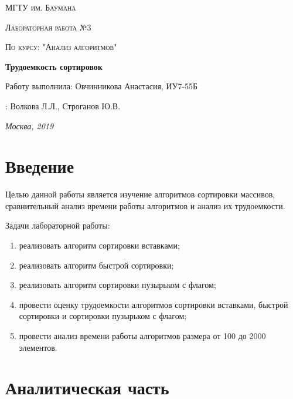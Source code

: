 \documentclass[a4paper,14pt]{report}
\begin{document}
\begin{titlepage}
	\centering
	{\scshape\LARGE МГТУ им. Баумана \par}
	\vspace{3cm}
	{\scshape\Large Лабораторная работа №3\par}
	\vspace{0.5cm}
	{\scshape\Large По курсу: "Анализ алгоритмов"\par}
	\vspace{1.5cm}
	{\huge\bfseries Трудоемкость сортировок\par}
	\vspace{2cm}
	\Large Работу выполнила: Овчинникова Анастасия, ИУ7-55Б\par
	\vspace{0.5cm}
	:  Волкова Л.Л., Строганов Ю.В.\par

	\vfill
	\large \textit {Москва, 2019} \par
\end{titlepage}

\tableofcontents

\newpage
\chapter*{Введение}

Целью данной работы является изучение алгоритмов сортировки массивов, сравнительный анализ времени работы алгоритмов и анализ их трудоемкости.

Задачи лабораторной работы:
\begin{enumerate}
	\item реализовать алгоритм сортировки вставками;
	\item реализовать алгоритм быстрой сортировки;
	\item реализовать алгоритм сортировки пузырьком с флагом;
	\item провести оценку трудоемкости алгоритмов сортировки вставками, быстрой сортировки и сортировки пузырьком с флагом;
	\item провести анализ времени работы алгоритмов размера от 100 до 2000 элементов.
\end{enumerate}


\chapter*{Аналитическая часть}
\end{document}
